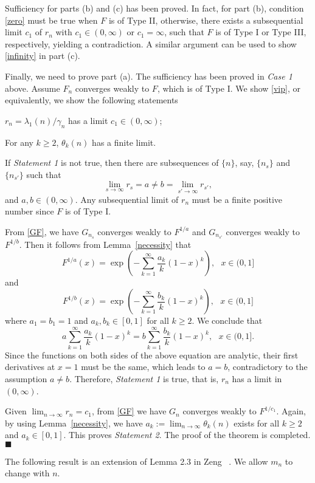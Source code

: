\documentclass[11pt]{article}
\numberwithin{equation}{section}
\begin{document}
Sufficiency for parts (b) and (c) has been proved. In fact, for part
(b), condition \eqref{zero} must be true when $F$ is of Type II,
otherwise, there exists a subsequential limit $c_1$ of $ r_n$ with
$c_1\in (0,\infty)$ or $c_1=\infty$, such that $F$ is of Type I or
Type III, respectively,  yielding a contradiction.  A similar
argument can be used to show \eqref{infinity} in part (c).

Finally,  we need to prove part (a).  The sufficiency has been
proved in {\it Case 1} above.  Assume $F_n$ converges weakly to $F$,
which is of Type I.  We show \eqref{vip}, or equivalently, we show
the following statements

 $r_n=\lambda_1(n)/\gamma_n$ has a limit
$c_1\in (0,\infty)$;

 For any $k\ge 2$, $\theta_{k}(n)$ has a
finite limit.


If {\it Statement 1} is not true, then there are subsequences of
$\{n\}$, say, $\{n_{s}\}$ and $\{n_{s'}\}$ such that
\[
\lim_{s\to\infty}r_{s}=a\ne b=\lim_{s'\to\infty}r_{s'},
\]
and $a, b\in (0,\infty)$.  Any subsequential limit of $r_n$ must be
a finite positive number since $F$ is of Type I.

From \eqref{GF}, we have $G_{n_s}$ converges weakly to $F^{1/a}$ and
$G_{n_{s'}}$ converges weakly to $F^{1/b}$.  Then it follows from
Lemma~\ref{necessity} that
\[
F^{1/a}(x)=\exp(-\sum^\infty_{k=1}\frac{a_k}{k}(1-x)^k), ~~~x\in
(0,1]
\]
and
\[
F^{1/b}(x)=\exp(-\sum^\infty_{k=1}\frac{b_k}{k}(1-x)^k), ~~~x\in
(0,1]
\]
where $a_1=b_1=1$ and $a_k, b_k\in [0,1]$ for all $k\ge 2$.   We
conclude that
\[
a\sum^\infty_{k=1}\frac{a_k}{k}(1-x)^k=b\sum^\infty_{k=1}\frac{b_k}{k}(1-x)^k,~~~x\in
(0,1].
\]
Since the functions on both sides of the above equation are
analytic, their first derivatives at $x=1$ must be the same, which
leads to $a=b$,  contradictory to the assumption $a\ne b$.
Therefore, {\it Statement 1} is true, that is, $r_n$ has a limit in
$(0,\infty)$.


Given $\lim_{n\to\infty}r_n=c_1$,  from \eqref{GF} we have $G_{n}$
converges weakly to $F^{1/c_1}$.  Again, by using
Lemma~\ref{necessity}, we have $a_k:=\lim_{n\to\infty}\theta_k(n)$
exists for all $k\ge 2$ and $a_k\in [0,1]$.   This proves {\it
Statement 2}.  The proof of the theorem is completed.
\hfill$\blacksquare$

 \vspace{10pt}


The following result is an extension of Lemma 2.3 in Zeng
~\cite{Zeng2017}. We allow $m_n$ to change with $n$.
\end{document}
